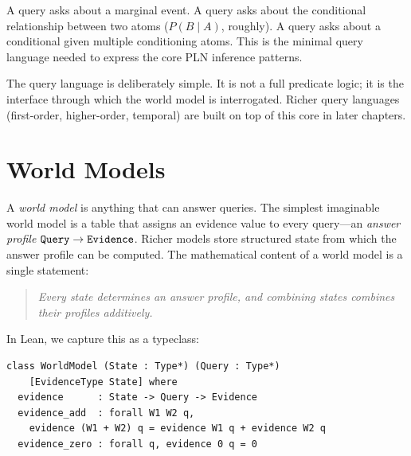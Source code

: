 \documentclass[11pt,openany]{report}
\begin{document}
A  query asks about a marginal event.  A  query asks
about the conditional relationship between two atoms ($P(B \mid A)$, roughly).
A  query asks about a conditional given multiple conditioning
atoms.  This is the minimal query language needed to express the core PLN
inference patterns.

The query language is deliberately simple.  It is not a full predicate logic;
it is the interface through which the world model is interrogated.  Richer
query languages (first-order, higher-order, temporal) are built on top of
this core in later chapters.


\section{World Models}
\label{sec:world-models}

A \emph{world model} is anything that can answer queries.  The simplest
imaginable world model is a table that assigns an evidence value to
every query---an \emph{answer profile} $\texttt{Query} \to \mathtt{Evidence}$.
Richer models store structured state from which the answer profile can
be computed.  The mathematical content of a world model is a single
statement:

\begin{quote}
\emph{Every state determines an answer profile, and combining states
combines their profiles additively.}
\end{quote}

\noindent
In Lean, we capture this as a typeclass:

\begin{lstlisting}
class WorldModel (State : Type*) (Query : Type*)
    [EvidenceType State] where
  evidence      : State -> Query -> Evidence
  evidence_add  : forall W1 W2 q,
    evidence (W1 + W2) q = evidence W1 q + evidence W2 q
  evidence_zero : forall q, evidence 0 q = 0
\end{lstlisting}
\end{document}
